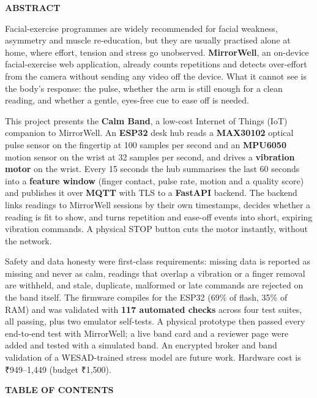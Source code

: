 \documentclass[12pt,letterpaper,oneside]{report}
\newcommand{\fronttitle}[1]{\begin{center}{\bfseries\fontsize{16}{22}\selectfont #1}\end{center}\vspace{10pt}}
\begin{document}
\fronttitle{ABSTRACT}\label{abs}
{\fontsize{14}{18.4}\selectfont\setlength{\parskip}{5pt}
Facial-exercise programmes are widely recommended for facial weakness, asymmetry and muscle re-education, but they are usually practised alone at home, where effort, tension and stress go unobserved. \textbf{MirrorWell}, an on-device facial-exercise web application, already counts repetitions and detects over-effort from the camera without sending any video off the device. What it cannot see is the body's response: the pulse, whether the arm is still enough for a clean reading, and whether a gentle, eyes-free cue to ease off is needed.

This project presents the \textbf{Calm Band}, a low-cost Internet of Things (IoT) companion to MirrorWell. An \textbf{ESP32} desk hub reads a \textbf{MAX30102} optical pulse sensor on the fingertip at 100 samples per second and an \textbf{MPU6050} motion sensor on the wrist at 32 samples per second, and drives a \textbf{vibration motor} on the wrist. Every 15 seconds the hub summarises the last 60 seconds into a \textbf{feature window} (finger contact, pulse rate, motion and a quality score) and publishes it over \textbf{MQTT} with TLS to a \textbf{FastAPI} backend. The backend links readings to MirrorWell sessions by their own timestamps, decides whether a reading is fit to show, and turns repetition and ease-off events into short, expiring vibration commands. A physical STOP button cuts the motor instantly, without the network.

Safety and data honesty were first-class requirements: missing data is reported as missing and never as calm, readings that overlap a vibration or a finger removal are withheld, and stale, duplicate, malformed or late commands are rejected on the band itself. The firmware compiles for the ESP32 (69\% of flash, 35\% of RAM) and was validated with \textbf{117 automated checks} across four test suites, all passing, plus two emulator self-tests. A physical prototype then passed every end-to-end test with MirrorWell; a live band card and a reviewer page were added and tested with a simulated band. An encrypted broker and band validation of a WESAD-trained stress model are future work. Hardware cost is ₹949–1,449 (budget ₹1,500).

}
\clearpage
\fronttitle{TABLE OF CONTENTS}\label{toc}
\end{document}
